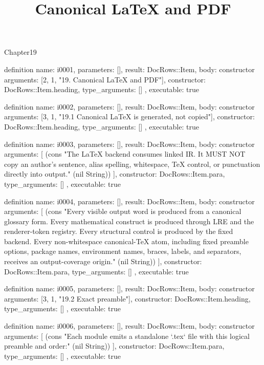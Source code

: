 \begin{lexlean}{Chapter19}
\title{Canonical LaTeX and PDF}
\begin{semanticmodule}
definition{
  name: i0001,
  parameters: [],
  result: DocRows::Item,
  body: constructor{
    arguments: [2, 1, "19. Canonical LaTeX and PDF"],
    constructor: DocRows::Item.heading,
    type_arguments: []
  },
  executable: true
}

definition{
  name: i0002,
  parameters: [],
  result: DocRows::Item,
  body: constructor{
    arguments: [3, 1, "19.1 Canonical LaTeX is generated, not copied"],
    constructor: DocRows::Item.heading,
    type_arguments: []
  },
  executable: true
}

definition{
  name: i0003,
  parameters: [],
  result: DocRows::Item,
  body: constructor{
    arguments: [
      (cons "The LaTeX backend consumes linked IR. It MUST NOT copy an author's sentence, alias spelling, whitespace, TeX control, or punctuation directly into output." (nil String))
    ],
    constructor: DocRows::Item.para,
    type_arguments: []
  },
  executable: true
}

definition{
  name: i0004,
  parameters: [],
  result: DocRows::Item,
  body: constructor{
    arguments: [
      (cons "Every visible output word is produced from a canonical glossary form. Every mathematical construct is produced through LRE and the renderer-token registry. Every structural control is produced by the fixed backend. Every non-whitespace canonical-TeX atom, including fixed preamble options, package names, environment names, braces, labels, and separators, receives an output-coverage origin." (nil String))
    ],
    constructor: DocRows::Item.para,
    type_arguments: []
  },
  executable: true
}

definition{
  name: i0005,
  parameters: [],
  result: DocRows::Item,
  body: constructor{
    arguments: [3, 1, "19.2 Exact preamble"],
    constructor: DocRows::Item.heading,
    type_arguments: []
  },
  executable: true
}

definition{
  name: i0006,
  parameters: [],
  result: DocRows::Item,
  body: constructor{
    arguments: [
      (cons "Each module emits a standalone `.tex` file with this logical preamble and order:" (nil String))
    ],
    constructor: DocRows::Item.para,
    type_arguments: []
  },
  executable: true
}


\end{semanticmodule}
\end{lexlean}
